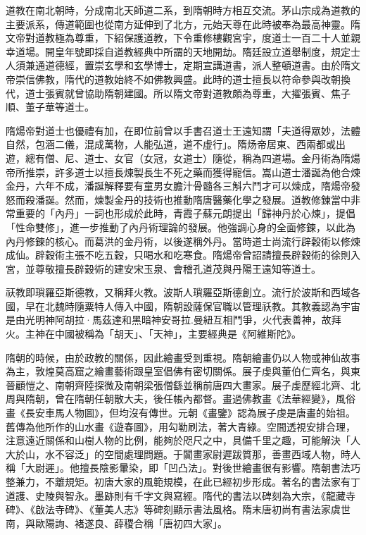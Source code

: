 道教在南北朝時，分成南北天師道二系，到隋朝時方相互交流。茅山宗成為道教的主要派系，傳道範圍也從南方延伸到了北方，元始天尊在此時被奉為最高神靈。隋文帝對道教極為尊重，下紹保護道教，下令重修樓觀宮宇，度道士一百二十人並親幸道場。開皇年號即採自道教經典中所謂的天地開劫。隋廷設立道舉制度，規定士人須兼通道德經，置崇玄學和玄學博士，定期宣講道書，派人整頓道書。由於隋文帝崇信佛教，隋代的道教始終不如佛教興盛。此時的道士擅長以符命參與改朝換代，道士張賓就曾協助隋朝建國。所以隋文帝對道教頗為尊重，大擢張賓、焦子順、董子華等道士。

隋煬帝對道士也優禮有加，在即位前曾以手書召道士王遠知謂「夫道得眾妙，法體自然，包涵二儀，混成萬物，人能弘道，道不虛行」。隋炀帝居東、西兩都或出遊，總有僧、尼、道士、女官（女冠，女道士）隨從，稱為四道場。金丹術為隋煬帝所推崇，許多道士以擅長煉製長生不死之藥而獲得寵信。嵩山道士潘誕為他合煉金丹，六年不成，潘誕解釋要有童男女膽汁骨髓各三斛六鬥才可以煉成，隋煬帝發怒而殺潘誕。然而，煉製金丹的技術也推動隋唐醫藥化學之發展。道教修鍊當中非常重要的「內丹」一詞也形成於此時，青霞子蘇元朗提出「歸神丹於心煉」，提倡「性命雙修」，進一步推動了內丹術理論的發展。他強調心身的全面修鍊，以此為內丹修鍊的核心。而葛洪的金丹術，以後遂稱外丹。當時道士尚流行辟穀術以修煉成仙。辟穀術主張不吃五穀，只喝水和吃寒食。隋煬帝曾詔請擅長辟穀術的徐則入宮，並尊敬擅長辟穀術的建安宋玉泉、會稽孔道茂與丹陽王遠知等道士。

祆教即瑣羅亞斯德教，又稱拜火教。波斯人瑣羅亞斯德創立。流行於波斯和西域各國，早在北魏時隨粟特人傳入中國，隋朝設薩保官職以管理祅教。其教義認為宇宙是由光明神阿胡拉·馬茲達和黑暗神安哥拉.曼紐互相鬥爭，火代表善神，故拜火。主神在中國被稱為「胡天」、「天神」，主要經典是《阿維斯陀》。

隋朝的時候，由於政教的關係，因此繪畫受到重視。隋朝繪畫仍以人物或神仙故事為主，敦煌莫高窟之繪畫藝術跟皇室倡佛有密切關係。展子虔與董伯仁齊名，與東晉顧愷之、南朝齊陸探微及南朝梁張僧繇並稱前唐四大畫家。展子虔歷經北齊、北周與隋朝，曾在隋朝任朝散大夫，後任帳內都督。畫過佛教畫《法華經變》，風俗畫《長安車馬人物圖》，但均沒有傳世。元朝《畫鑒》認為展子虔是唐畫的始祖。舊傳為他所作的山水畫《遊春圖》，用勾勒刷法，著大青綠。空間透視安排合理，注意遠近關係和山樹人物的比例，能夠於咫尺之中，具備千里之趣，可能解決「人大於山，水不容泛」的空間處理問題。于闐畫家尉遲跋質那，善畫西域人物，時人稱「大尉遲」。他擅長陰影暈染，即「凹凸法」。對後世繪畫很有影響。隋朝書法巧整兼力，不離規矩。初唐大家的風範規模，在此已經初步形成。著名的書法家有丁道護、史陵與智永。墨跡則有千字文與寫經。隋代的書法以碑刻為大宗，《龍藏寺碑》、《啟法寺碑》、《董美人志》等碑刻顯示書法風格。隋末唐初尚有書法家虞世南，與歐陽詢、褚遂良、薛稷合稱「唐初四大家」。

